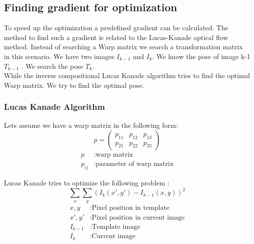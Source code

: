 \documentclass[11pt,a4paper,titlepage,oneside]{report}
\begin{document}
\subsection{Finding gradient for optimization}
To speed up the optimization a predefined gradient can be calculated. The method to find such a gradient is related to the Lucas-Kanade optical flow method. Instead of searching a Warp matrix we search a transformation matrix in this scenario. We have two images $I_{k-1}$ and $I_{k}$. We know the pose of image k-1 $T_{k-1}$ . We search the pose $T_k$.\\
While the inverse compositional Lucas Kanade algorithm tries to find the optimal Warp matrix. We try to find the optimal pose.
\subsubsection{Lucas Kanade Algorithm}
Lets assume we have a warp matrix in the following form:
\begin{equation}\label{eq:lk_warp}
	p=\begin{pmatrix}
		p_{11} & p_{12} & p_{13} \\
		p_{21} & p_{22} & p_{23}
	\end{pmatrix}
\end{equation}
\begin{align*}
	p				&:	\text{warp matrix}\\
	p_{ij}	&:	\text{parameter of warp matrix}
\end{align*}


Lucas Kanade tries to optimize the following problem \cite{inverse_compositional}:
\begin{equation}\label{eq:lk_problem}
	\sum_x\sum_y(I_{k}(x',y')-I_{k-1}(x,y))^2
\end{equation}
\begin{align*}
	x,y				&:	\text{Pixel position in template}\\
	x',y'			&:	\text{Pixel position in current image}\\
	I_{k-1}		&:	\text{Template image}\\
	I_{k}			&:	\text{Current image}
\end{align*}
\end{document}

